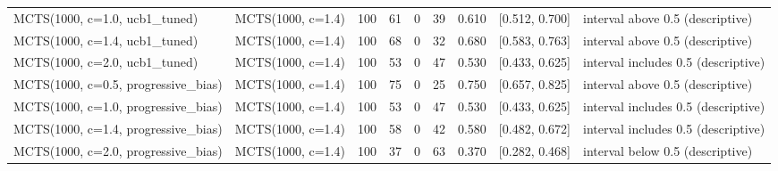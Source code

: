 \begin{table}[!t]
\begin{tabular}{llrrrrrll}
MCTS(1000, c=1.0, ucb1\_tuned) & MCTS(1000, c=1.4) & 100 & 61 & 0 & 39 & 0.610 & [0.512, 0.700] & interval above 0.5 (descriptive) \\
MCTS(1000, c=1.4, ucb1\_tuned) & MCTS(1000, c=1.4) & 100 & 68 & 0 & 32 & 0.680 & [0.583, 0.763] & interval above 0.5 (descriptive) \\
MCTS(1000, c=2.0, ucb1\_tuned) & MCTS(1000, c=1.4) & 100 & 53 & 0 & 47 & 0.530 & [0.433, 0.625] & interval includes 0.5 (descriptive) \\
MCTS(1000, c=0.5, progressive\_bias) & MCTS(1000, c=1.4) & 100 & 75 & 0 & 25 & 0.750 & [0.657, 0.825] & interval above 0.5 (descriptive) \\
MCTS(1000, c=1.0, progressive\_bias) & MCTS(1000, c=1.4) & 100 & 53 & 0 & 47 & 0.530 & [0.433, 0.625] & interval includes 0.5 (descriptive) \\
MCTS(1000, c=1.4, progressive\_bias) & MCTS(1000, c=1.4) & 100 & 58 & 0 & 42 & 0.580 & [0.482, 0.672] & interval includes 0.5 (descriptive) \\
MCTS(1000, c=2.0, progressive\_bias) & MCTS(1000, c=1.4) & 100 & 37 & 0 & 63 & 0.370 & [0.282, 0.468] & interval below 0.5 (descriptive) \\
\bottomrule
\end{tabular}
\end{table}
